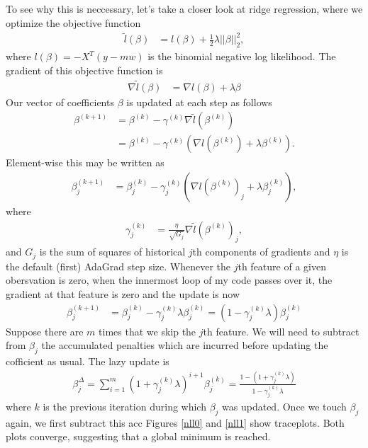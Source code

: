 \documentclass{article}
\begin{document}
To see why this is neccessary, let's take a closer look at ridge regression, where we optimize the objective function
%
%
%
	\begin{align}
		\tilde{l}(\beta) &= l(\beta) + \frac{1}{2}\lambda ||\beta||_2^2,
	\end{align}
	where $l(\beta) = -X^T(y - mw)$ is the binomial negative log likelihood. The gradient of this objective function is
	\begin{align}
		\nabla \tilde{l}(\beta) &= \nabla l(\beta) + \lambda \beta
	\end{align}
	Our vector of coefficients $\beta$ is updated at each step as follows
	\begin{align}
		\beta^{(k+1)}  &= \beta^{(k)} - \gamma^{(k)} \nabla \tilde{l}(\beta^{(k)}) \\
		&= \beta^{(k)} - \gamma^{(k)} \left ( \nabla l(\beta^{(k)}) + \lambda \beta^{(k)} \right).
	\end{align}
	Element-wise this may be written as 
	\begin{align}
		\beta^{(k+1)}_j &= \beta^{(k)}_j - \gamma_j^{(k)} \left ( \nabla l(\beta^{(k)})_j + \lambda \beta^{(k)}_j \right),
	\end{align}
	where
	\begin{align}
		\gamma_j^{(k)} &= \frac{\eta}{\sqrt{G_j}} \nabla \tilde{l}(\beta^{(k)})_j,
	\end{align}
	and $G_j$ is the sum of squares of historical $j$th components of gradients and $\eta$ is the default (first) AdaGrad step size. Whenever the $j$th feature of a given obersvation is zero, when the innermost loop of my code passes over it, the gradient at that feature is zero and the update is now
	\begin{align}
		\beta^{(k+1)}_j &= \beta^{(k)}_j - \gamma_j^{(k)} \lambda \beta^{(k)}_j = \left ( 1 - \gamma_j^{(k)} \lambda \right ) \beta^{(k)}_j 
	\end{align}
	Suppose there are $m$ times that we skip the $j$th feature. We will need to subtract from $\beta_j$ the accumulated penalties which are incurred before updating the cofficient as usual. The lazy update is
%
%
%
\begin{align}
	\beta^\Delta_j = \sum_{i = 1}^{m}  (1 + \gamma_j^{(k)} \lambda) ^ {i+1} \beta^{(k)}_j = \frac{1 - \left( 1 + \gamma_j^{(k)} \lambda \right )}{1 - \gamma_j^{(k)} \lambda}
\end{align}
%
%
%
where $k$ is the previous iteration during which $\beta_j$ was updated.
%
%
%
Once we touch $\beta_j$ again, we first subtract this acc
Figures \ref{nll0} and \ref{nll1} show traceplots. Both plots converge, suggesting that a global minimum is reached.
\end{document}
